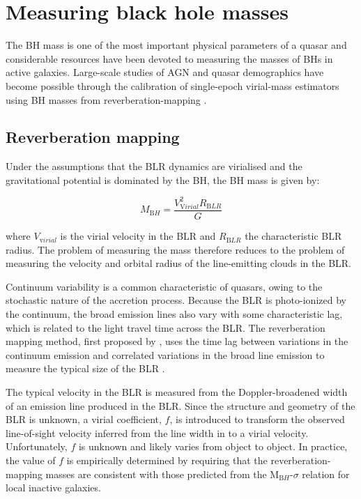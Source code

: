 \section{Measuring black hole masses}

The BH mass is one of the most important physical parameters of a quasar and considerable resources have been devoted to measuring the masses of BHs in active galaxies. 
Large-scale studies of AGN and quasar demographics have become possible through the calibration of single-epoch virial-mass estimators using BH masses from reverberation-mapping \citep[e.g.][]{peterson10,vestergaard11,marziani12,shen13}.  

\subsection{Reverberation mapping}

Under the assumptions that the BLR dynamics are virialised  and the gravitational potential is dominated by the BH, the BH mass is given by:

\begin{equation}
M_{\mathrm BH} = \frac{V_{\mathrm Virial}^2R_{\mathrm BLR}}{G} 
\end{equation}

where $V_{\mathrm virial}$ is the virial velocity in the BLR and $R_{\mathrm BLR}$ the characteristic BLR radius.
The problem of measuring the mass therefore reduces to the problem of measuring the velocity and orbital radius of the line-emitting clouds in the BLR. 

Continuum variability is a common characteristic of quasars, owing to the stochastic nature of the accretion process.  
Because the BLR is photo-ionized by the continuum, the broad emission lines also vary with some characteristic lag, which is related to the light travel time across the BLR. 
The reverberation mapping method, first proposed by \citet{blandford82a}, uses the time lag between variations in the continuum emission and correlated variations in the broad line emission to measure the typical size of the BLR \citep[e.g.][]{peterson93,netzer97,peterson14}. 

The typical velocity in the BLR is measured from the Doppler-broadened width of an emission line produced in the BLR. 
Since the structure and geometry of the BLR is unknown, a virial coefficient, $f$, is introduced to transform the observed line-of-sight velocity inferred from the line width in to a virial velocity.
Unfortunately, $f$ is unknown and likely varies from object to object.  
In practice, the value of $f$ is empirically determined by requiring that the reverberation-mapping masses are consistent with those predicted from the M$_{\mathrm BH}$-$\sigma$ relation for local inactive galaxies. 

